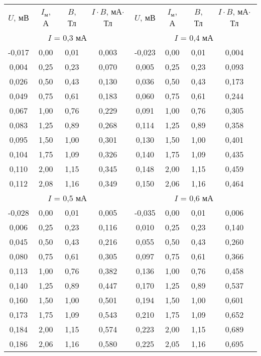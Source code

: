 \begin{tabular}{cccc|cccc}
\toprule
$U$, мВ & $I_\text{м}$, А & $B$, Тл & $I\cdot B$, мА$\cdot$Тл &
$U$, мВ & $I_\text{м}$, А & $B$, Тл & $I\cdot B$, мА$\cdot$Тл \\

\multicolumn{4}{c}{$I$ = 0,3 мА} & \multicolumn{4}{c}{$I$ = 0,4 мА} \\

-0,017 & 0,00 & 0,01 & 0,003 & -0,023 & 0,00 & 0,01 & 0,004 \\
 0,004 & 0,25 & 0,23 & 0,070 &  0,005 & 0,25 & 0,23 & 0,093 \\
 0,026 & 0,50 & 0,43 & 0,130 &  0,036 & 0,50 & 0,43 & 0,173 \\
 0,049 & 0,75 & 0,61 & 0,183 &  0,060 & 0,75 & 0,61 & 0,244 \\
 0,067 & 1,00 & 0,76 & 0,229 &  0,091 & 1,00 & 0,76 & 0,305 \\
 0,083 & 1,25 & 0,89 & 0,268 &  0,114 & 1,25 & 0,89 & 0,358 \\
 0,095 & 1,50 & 1,00 & 0,301 &  0,130 & 1,50 & 1,00 & 0,401 \\
 0,104 & 1,75 & 1,09 & 0,326 &  0,140 & 1,75 & 1,09 & 0,435 \\
 0,110 & 2,00 & 1,15 & 0,345 &  0,148 & 2,00 & 1,15 & 0,459 \\
 0,112 & 2,08 & 1,16 & 0,349 &  0,150 & 2,06 & 1,16 & 0,464 \\

 \multicolumn{4}{c}{$I$ = 0,5 мА} & \multicolumn{4}{c}{$I$ = 0,6 мА}\\
 
 -0,028 & 0,00 & 0,01 & 0,005 & -0,035 & 0,00 & 0,01 & 0,006 \\
 0,006 & 0,25 & 0,23 & 0,116 &  0,010 & 0,25 & 0,23 & 0,140 \\
 0,045 & 0,50 & 0,43 & 0,216 &  0,055 & 0,50 & 0,43 & 0,260 \\
 0,080 & 0,75 & 0,61 & 0,305 &  0,097 & 0,75 & 0,61 & 0,366 \\
 0,113 & 1,00 & 0,76 & 0,382 &  0,136 & 1,00 & 0,76 & 0,458 \\
 0,140 & 1,25 & 0,89 & 0,447 &  0,170 & 1,25 & 0,89 & 0,537 \\
 0,160 & 1,50 & 1,00 & 0,501 &  0,194 & 1,50 & 1,00 & 0,601 \\
 0,173 & 1,75 & 1,09 & 0,543 &  0,210 & 1,75 & 1,09 & 0,652 \\
 0,184 & 2,00 & 1,15 & 0,574 &  0,223 & 2,00 & 1,15 & 0,689 \\
 0,186 & 2,06 & 1,16 & 0,580 &  0,225 & 2,05 & 1,16 & 0,695 \\
 

\end{tabular}
